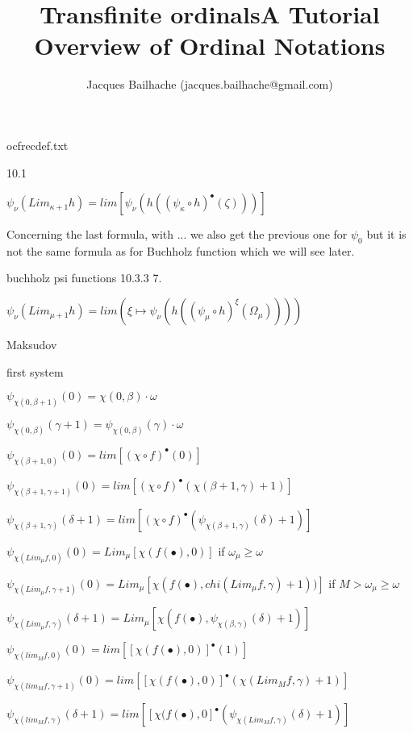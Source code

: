 \documentclass[10pt]{article}
\title{Transfinite ordinals}
\begin{document}
\title{A Tutorial Overview of Ordinal Notations}
\author{Jacques Bailhache (jacques.bailhache@gmail.com)}

\maketitle

\setlength{\parindent}{0pt}

ocfrecdef.txt

10.1

\( \psi_\nu (Lim_{\kappa+1} h) = lim [ \psi_\nu (h ((\psi_\kappa \circ h)^\bullet (\zeta)))] \)

Concerning the last formula, with ... we also get the previous one for \( \psi_0 \) but it is not the same formula as for Buchholz function which we will see later.


buchholz psi functions
10.3.3 7.

\( \psi_\nu(Lim_{\mu+1} h) = lim (\xi \mapsto \psi_\nu (h ((\psi_\mu \circ h)^\xi (\Omega_\mu)))) \) 


Maksudov

first system

\( \psi_{\chi(0,\beta+1)}(0) = \chi(0,\beta) \cdot \omega \)

\( \psi_{\chi(0,\beta)}(\gamma+1) = \psi_{\chi(0,\beta)}(\gamma) \cdot \omega \)


\( \psi_{\chi(\beta+1,0)}(0) = lim [(\chi \circ f)^\bullet(0)] \)

\( \psi_{\chi(\beta+1,\gamma+1)}(0) = lim [(\chi \circ f)^\bullet (\chi(\beta+1,\gamma)+1)] \)

\( \psi_{\chi(\beta+1,\gamma)}(\delta+1) = lim [(\chi \circ f)^\bullet (\psi_{\chi(\beta+1,\gamma)}(\delta)+1)] \)


\( \psi_{\chi(Lim_\mu f,0)}(0) = Lim_\mu [\chi(f(\bullet),0)] \) if \( \omega_\mu \ge \omega \)

\( \psi_{\chi(Lim_\mu f,\gamma+1)}(0) = Lim_\mu [\chi(f(\bullet),chi(Lim_\mu f,\gamma)+1))] \) if \( M > \omega_\mu \ge \omega \)

\( \psi_{\chi(Lim_\mu f,\gamma)}(\delta+1) = Lim_\mu [\chi(f(\bullet),\psi_{\chi(\beta,\gamma)}(\delta)+1)] \)


\( \psi_{\chi(lim_M f,0)}(0) = lim [ [\chi(f(\bullet),0)]^\bullet(1) ] \)

\( \psi_{\chi(lim_M f,\gamma+1)}(0) = lim [ [\chi(f(\bullet),0)]^\bullet(\chi(Lim_M f,\gamma)+1)] \)

\( \psi_{\chi(lim_M f,\gamma)}(\delta+1) = lim [ [\chi(f(\bullet),0]^\bullet(\psi_{\chi(Lim_M f,\gamma)}(\delta)+1) ] \)
\end{document}
